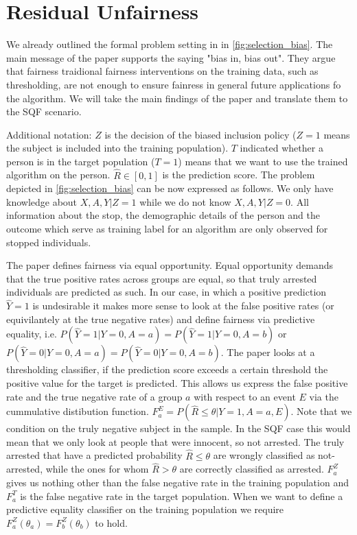 \section{Residual Unfairness}
We already outlined the formal problem setting in \cite{kallus2018} in \autoref{fig:selection_bias}. The main message of the paper supports the saying "bias in, bias out". They argue that fairness traidional fairness interventions on the training data, such as thresholding, are not enough to ensure fainress in general future applications fo the algorithm. We will take the main findings of the paper and translate them to the SQF scenario.

Additional notation: $Z$ is the decision of the biased inclusion policy ($Z= 1$ means the subject is included into the training population). $T$ indicated whether a person is in the target population ($T = 1$) means that we want to use the trained algorithm on the person. $\hat{R} \in [0,1]$ is the prediction score.
The problem depicted in \autoref{fig:selection_bias} can be now expressed as follows. We only have knowledge about $X, A, Y | Z = 1$ while we do not know $X, A, Y | Z = 0$. All information about the stop, the demographic details of the person and the outcome which serve as training label for an algorithm are only observed for stopped individuals.

The paper defines fairness via equal opportunity. Equal opportunity demands that the true positive rates across groups are equal, so that truly arrested individuals are predicted as such. In our case, in which a positive prediction $\hat{Y} = 1$ is undesirable it makes more sense to look at the false positive rates (or equivilantely at the true negative rates) and define fairness via predictive equality, i.e. $P(\hat{Y} = 1 | Y = 0, A = a) = P(\hat{Y} = 1 | Y = 0, A = b)$ or $P(\hat{Y} = 0 | Y = 0, A = a) = P(\hat{Y} = 0 | Y = 0, A = b)$.
The paper looks at a thresholding classifier, if the prediction score exceeds a certain threshold the positive value for the target is predicted.
This allows us express the false positive rate and the true negative rate of a group $a$ with respect to an event $E$ via the cummulative distibution function. $F_a^E = P(\hat{R} \leq \theta | Y = 1, A = a, E)$. Note that we condition on the truly negative subject in the sample. In the SQF case this would mean that we only look at people that were innocent, so not arrested.
The truly arrested that have a predicted probability $\hat{R} \leq \theta$ are wrongly classified as not-arrested, while the ones for whom $\hat{R} > \theta$ are correctly classified as arrested. $F_a^Z$ gives us nothing other than the false negative rate in the training population and $F_a^T$ is the false negative rate in the target population.
When we want to define a predictive equality classifier on the training population we require $F_a^Z(\theta_a) = F_b^Z(\theta_b)$ to hold. 

